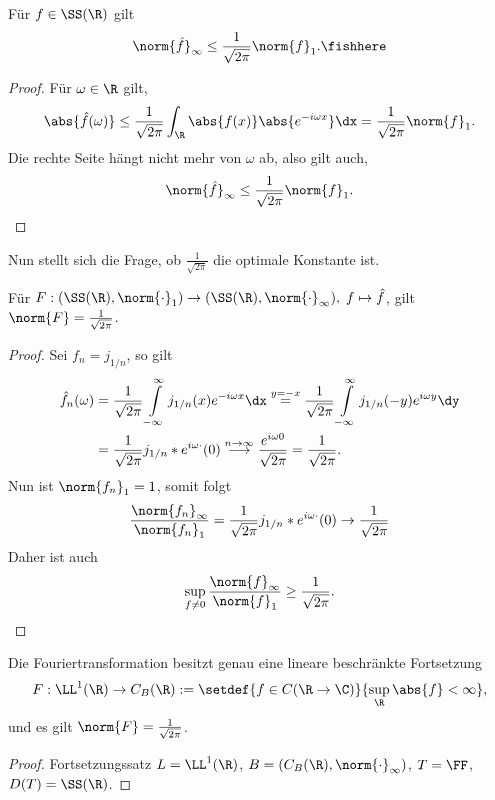 \begin{cor}
\label{prop:2.28}
Für $f\in\SS(\R)$ gilt
\begin{align*}
\norm{\hat{f}}_\infty \le \frac{1}{\sqrt{2\pi}}\norm{f}_1.\fishhere
\end{align*}
\end{cor}
\begin{proof} Für $\omega\in\R$ gilt,
\begin{align*}
\abs{\hat{f}(\omega)} \le \frac{1}{\sqrt{2\pi}}\int_\R
\abs{f(x)}\abs{e^{-i\omega x}}\dx = \frac{1}{\sqrt{2\pi}}\norm{f}_1.
\end{align*}
Die rechte Seite hängt nicht mehr von $\omega$ ab, also gilt auch,
\begin{align*}
\norm{\hat{f}}_\infty \le\frac{1}{\sqrt{2\pi}}\norm{f}_1.\qedhere
\end{align*}
\end{proof}

Nun stellt sich die Frage, ob $\frac{1}{\sqrt{2\pi}}$ die optimale Konstante
ist.

\begin{prop}
\label{prop:2.29}
Für $F: (\SS(\R),\norm{\cdot}_1)\to (\SS(\R),\norm{\cdot}_\infty),\; f\mapsto
\hat{f}$, gilt $\norm{F}=\frac{1}{\sqrt{2\pi}}$.\fishhere
\end{prop}
\begin{proof}
Sei $f_n = j_{1/n}$, so gilt
\begin{align*}
\hat{f}_n(\omega) &= \frac{1}{\sqrt{2\pi}}
\int\limits_{-\infty}^\infty j_{1/n}(x)e^{-i\omega x}\dx
\overset{y=-x}{=} \frac{1}{\sqrt{2\pi}}\int\limits_{-\infty}^\infty
j_{1/n}(-y)e^{i\omega y}\dy\\
&= \frac{1}{\sqrt{2\pi}}j_{1/n}*e^{i\omega \cdot}(0)
\overset{n\to\infty}{\longrightarrow} \frac{e^{i\omega 0}}{\sqrt{2\pi}} =
\frac{1}{\sqrt{2\pi}}.
\end{align*}
Nun ist $\norm{f_n}_1 = 1$, somit folgt
\begin{align*}
\frac{\norm{f_n}_\infty}{\norm{f_n}_1} =
\frac{1}{\sqrt{2\pi}}j_{1/n}*e^{i\omega \cdot}(0) \to \frac{1}{\sqrt{2\pi}}
\end{align*}
Daher ist auch
\begin{align*}
\sup\limits_{f\neq 0} \frac{\norm{f}_\infty}{\norm{f}_1}
\ge \frac{1}{\sqrt{2\pi}}.\qedhere
\end{align*}
\end{proof}

\begin{prop}
\label{prop:2.30}
Die Fouriertransformation besitzt genau eine lineare beschränkte Fortsetzung
\begin{align*}
F: \LL^1(\R)\to C_B(\R) :=\setdef{f\in C(\R\to\C)}{\sup_\R \abs{f} <\infty},
\end{align*}
und es gilt $\norm{F}=\frac{1}{\sqrt{2\pi}}$.\fishhere
\end{prop}
\begin{proof}
Fortsetzungssatz $L=\LL^1(\R)$, $B=(C_B(\R),\norm{\cdot}_\infty)$, $T=\FF$,
$D(T)=\SS(\R)$.\qedhere
\end{proof}

